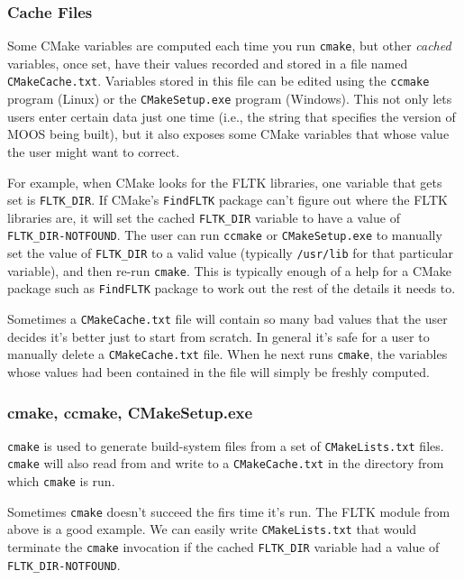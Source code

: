 \documentclass[letterpaper,10pt]{article}
\begin{document}
\subsubsection{Cache Files}
Some CMake variables are computed each time you run \verb|cmake|, but other
\textit{cached} variables, once set, have their values recorded and stored in
a file named \verb|CMakeCache.txt|.  Variables stored in this file can be
edited using the \verb|ccmake| program (Linux) or the \verb|CMakeSetup.exe|
program (Windows).  This not only lets users enter certain data just one time
(i.e., the string that specifies the version of MOOS being built), but it also
exposes some CMake variables that whose value the user might want to correct.

For example, when CMake looks for the FLTK libraries, one variable that gets
set is \verb|FLTK_DIR|.  If CMake's \verb|FindFLTK| package can't figure out
where the FLTK libraries are, it will set the cached \verb|FLTK_DIR| variable
to have a value of \verb|FLTK_DIR-NOTFOUND|.  The user can run \verb|ccmake|
or \verb|CMakeSetup.exe| to manually set the value of \verb|FLTK_DIR| to
a valid value (typically \verb|/usr/lib| for that particular variable), and
then re-run \verb|cmake|.  This is typically enough of a help for a CMake
package such as \verb|FindFLTK| package to work out the rest of the details it
needs to.

Sometimes a \verb|CMakeCache.txt| file will contain so many bad values that
the user decides it's better just to start from scratch.  In general it's
safe for a user to manually delete a \verb|CMakeCache.txt| file.  When he
next runs \verb|cmake|, the variables whose values had been contained in the
file will simply be freshly computed.

\subsubsection{cmake, ccmake, CMakeSetup.exe}
\label{sec:ccmake}
\verb|cmake| is used to generate build-system files from a set of \verb|CMakeLists.txt|
files.  \verb|cmake| will also read from and write to a \verb|CMakeCache.txt| in the
directory from which \verb|cmake| is run.

Sometimes \verb|cmake| doesn't succeed the firs time it's run.  The FLTK module from
above is a good example.  We can easily write \verb|CMakeLists.txt| that would terminate
the \verb|cmake| invocation if the cached \verb|FLTK_DIR| variable had a value of \verb|FLTK_DIR-NOTFOUND|.
\end{document}
